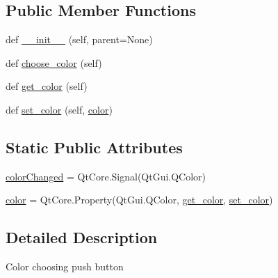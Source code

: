 \subsection*{Public Member Functions}
\begin{DoxyCompactItemize}
\item 
def \hyperlink{classmatplotlib_1_1backends_1_1qt__editor_1_1__formlayout_1_1ColorButton_ae6c3ce91bded5a70b10f5b899d82a56c}{\+\_\+\+\_\+init\+\_\+\+\_\+} (self, parent=None)
\item 
def \hyperlink{classmatplotlib_1_1backends_1_1qt__editor_1_1__formlayout_1_1ColorButton_abeed3a04d4c3267a5c10109a3110e341}{choose\+\_\+color} (self)
\item 
def \hyperlink{classmatplotlib_1_1backends_1_1qt__editor_1_1__formlayout_1_1ColorButton_a69e9f06d709ad3c7c05902fb7152f31d}{get\+\_\+color} (self)
\item 
def \hyperlink{classmatplotlib_1_1backends_1_1qt__editor_1_1__formlayout_1_1ColorButton_a01d6301ae5712455c5652e490bef2e56}{set\+\_\+color} (self, \hyperlink{classmatplotlib_1_1backends_1_1qt__editor_1_1__formlayout_1_1ColorButton_ab3737c0951ab3efa8b452b0c1defd5c8}{color})
\end{DoxyCompactItemize}
\subsection*{Static Public Attributes}
\begin{DoxyCompactItemize}
\item 
\hyperlink{classmatplotlib_1_1backends_1_1qt__editor_1_1__formlayout_1_1ColorButton_a8b3de582d2b5c5b74d3a33a28b5b61ca}{color\+Changed} = Qt\+Core.\+Signal(Qt\+Gui.\+Q\+Color)
\item 
\hyperlink{classmatplotlib_1_1backends_1_1qt__editor_1_1__formlayout_1_1ColorButton_ab3737c0951ab3efa8b452b0c1defd5c8}{color} = Qt\+Core.\+Property(Qt\+Gui.\+Q\+Color, \hyperlink{classmatplotlib_1_1backends_1_1qt__editor_1_1__formlayout_1_1ColorButton_a69e9f06d709ad3c7c05902fb7152f31d}{get\+\_\+color}, \hyperlink{classmatplotlib_1_1backends_1_1qt__editor_1_1__formlayout_1_1ColorButton_a01d6301ae5712455c5652e490bef2e56}{set\+\_\+color})
\end{DoxyCompactItemize}


\subsection{Detailed Description}
\begin{DoxyVerb}Color choosing push button
\end{DoxyVerb}
 


